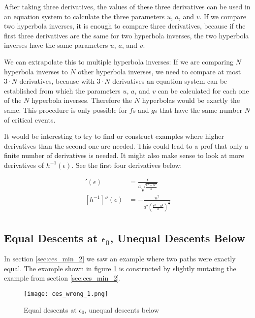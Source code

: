 After taking three derivatives, the values of these three derivatives can be used in an equation system to calculate the three parameters $u$, $a$, and $v$. If we compare two hyperbola inverses, it is enough to compare three derivatives, because if the first three derivatives are the same for two hyperbola inverses, the two hyperbola inverses have the same parameters $u$, $a$, and $v$.

We can extrapolate this to multiple hyperbola inverses: If we are comparing $N$ hyperbola inverses to $N$ other hyperbola inverses, we need to compare at most $3\cdot N$ derivatives, because with $3\cdot N$ derivatives an equation system can be established from which the parameters $u$, $a$, and $v$ can be calculated for each one of the $N$ hyperbola inverses. Therefore the $N$ hyperbolas would be exactly the same. This procedure is only possible for $f$s and $g$s that have the same number $N$ of critical events.

It would be interesting to try to find or construct examples where higher derivatives than the second one are needed. This could lead to a prof that only a finite number of derivatives is needed. It might also make sense to look at more derivatives of $h^{-1}(\epsilon)$. See the first four derivatives below:

\begin{align*}
	[h^{-1}]'(\epsilon) &= \frac{ \epsilon }{ a\sqrt{\frac{\epsilon^2 - u^2}{a}} }\\
	[h^{-1}]''(\epsilon) &= -\frac{u^2}{a^2\left(\frac{\epsilon^2 - u^2}{a}\right)^{\frac{3}{2}}}\\
\end{align*}

	
\subsection{Equal Descents at $\epsilon_0$, Unequal Descents Below}

In section \ref{sec:ces_min_2} we saw an example where two paths were exactly equal. The example shown in figure \ref{fig:ces_wrong_1} is constructed by slightly mutating the example from section \ref{sec:ces_min_2}.

\begin{figure}[H]
	\centering
    
    \texttt{[image: ces\_wrong\_1.png]}
		
	\caption{Equal descents at $\epsilon_0$, unequal descents below\protect\footnotemark}
    \label{fig:ces_wrong_1}
\end{figure}

